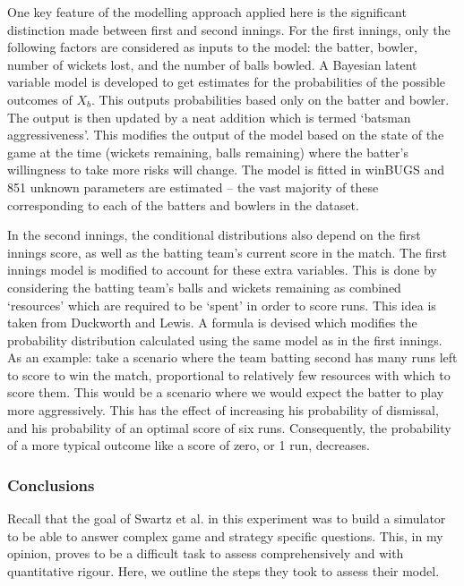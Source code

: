 One key feature of the modelling approach applied here is the significant distinction made between first and second innings. For the first innings, only the following factors are considered as inputs to the model: the batter, bowler, number of wickets lost, and the number of balls bowled. A Bayesian latent variable model is developed to get estimates for the probabilities of the possible outcomes of $X_{b}$. This outputs probabilities based only on the batter and bowler. The output is then updated by a neat addition which is termed ‘batsman aggressiveness’. This modifies the output of the model based on the state of the game at the time (wickets remaining, balls remaining) where the batter’s willingness to take more risks will change. The model is fitted in winBUGS and 851 unknown parameters are estimated – the vast majority of these corresponding to each of the batters and bowlers in the dataset.

In the second innings, the conditional distributions also depend on the first innings score, as well as the batting team’s current score in the match. The first innings model is modified to account for these extra variables. This is done by considering the batting team’s balls and wickets remaining as combined ‘resources’ which are required to be ‘spent’ in order to score runs. This idea is taken from Duckworth and Lewis. \cite{duckworth_fair_1998} \cite{duckworth_successful_2004} A formula is devised which modifies the probability distribution calculated using the same model as in the first innings. As an example: take a scenario where the team batting second has many runs left to score to win the match, proportional to relatively few resources with which to score them. This would be a scenario where we would expect the batter to play more aggressively. This has the effect of increasing his probability of dismissal, and his probability of an optimal score of six runs. Consequently, the probability of a more typical outcome like a score of zero, or 1 run, decreases.

\subsubsection{Conclusions}

Recall that the goal of Swartz et al. in this experiment was to build a simulator to be able to answer complex game and strategy specific questions. This, in my opinion, proves to be a difficult task to assess comprehensively and with quantitative rigour. Here, we outline the steps they took to assess their model.

